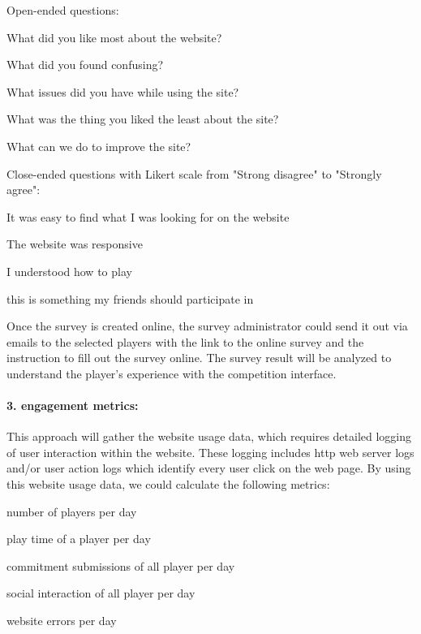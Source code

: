 \documentclass[11pt]{article}
\begin{document}
Open-ended questions: 
\begin{compactitem}
\item What did you like most about the website?
\item What did you found confusing?
\item What issues did you have while using the site?
\item What was the thing you liked the least about the site?
\item What can we do to improve the site?\\
\end{compactitem}

Close-ended questions with Likert scale from "Strong disagree" to "Strongly agree": 
\begin{compactitem}
\item It was easy to find what I was looking for on the website
\item The website was responsive 
\item I understood how to play
\item this is something my friends should participate in
\end{compactitem}

Once the survey is created online, the survey administrator could send it out via emails to the selected players with the link to the online survey and the instruction to fill out the survey online.
The survey result will be analyzed to understand the player's experience with the competition interface.
 
\paragraph{3. engagement metrics: }

This approach will gather the website usage data, which requires detailed logging of user interaction within the website. These logging includes http web server logs and/or user action logs which identify every user click on the web page. By using this website usage data, we could calculate the following metrics:

\begin{compactitem}
\item  number of players per day
\item  play time of a player per day
\item  commitment submissions of all player per day
\item  social interaction of all player per day
\item  website errors per day
\end{compactitem}
\end{document}
